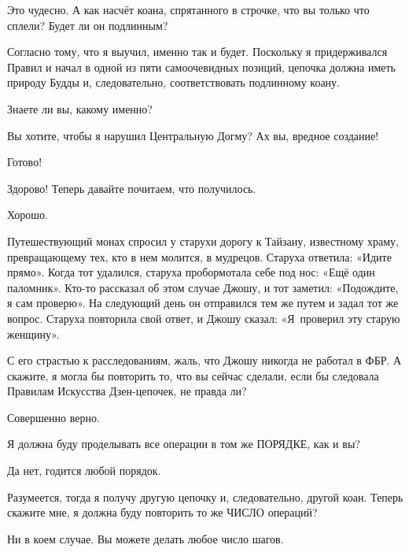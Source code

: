\documentclass[../main.tex]{subfiles}
\begin{document}
\begin{dialogue}
 Это чудесно. А как насчёт коана, спрятанного в строчке, что вы только что сплели? Будет ли он подлинным?

 Согласно тому, что я выучил, именно так и будет. Поскольку я придерживался Правил и начал в одной из пяти самоочевидных позиций, цепочка должна иметь природу Будды и, следовательно, соответствовать подлинному коану.

 Знаете ли вы, какому именно?

 Вы хотите, чтобы я нарушил Центральную Догму? Ах вы, вредное создание!


Готово!

 Здорово! Теперь давайте почитаем, что получилось.

 Хорошо.

\begin{koan}
    Путешествующий монах спросил у старухи дорогу к Тайзаиу, известному храму, превращающему тех, кто в нем молится, в мудрецов. Старуха ответила: «Идите прямо». Когда тот удалился, старуха пробормотала себе под нос: «Ещё один паломник». Кто-то рассказал об этом случае Джошу, и тот заметил: «Подождите, я сам проверю». На следующий день он отправился тем же путем и задал тот же вопрос. Старуха повторила свой ответ, и Джошу сказал: «Я~проверил эту старую женщину».
\end{koan}

 С его страстью к расследованиям, жаль, что Джошу никогда не работал в ФБР\@. А скажите, я могла бы повторить то, что вы сейчас сделали, если бы следовала Правилам Искусства Дзен-цепочек, не правда ли?

 Совершенно верно.

 Я должна буду проделывать все операции в том же ПОРЯДКЕ, как и вы?

 Да нет, годится любой порядок.

 Разумеется, тогда я получу другую цепочку и, следовательно, другой коан. Теперь скажите мне, я должна буду повторить то же ЧИСЛО операций?

 Ни в коем случае. Вы можете делать любое число шагов.


\end{dialogue}
\end{document}
